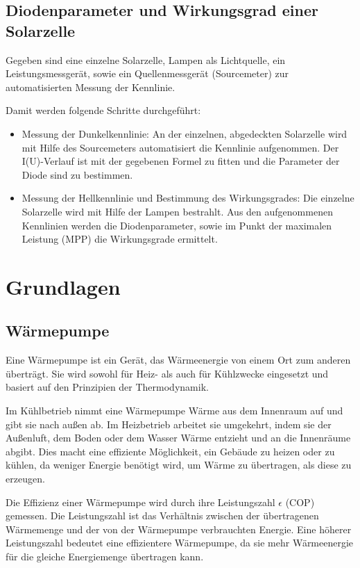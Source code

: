 \documentclass[12pt,english,ngerman]{scrartcl}
\begin{document}
\subsection{Diodenparameter und Wirkungsgrad einer Solarzelle}

Gegeben sind eine einzelne Solarzelle, Lampen als Lichtquelle, ein
Leistungsmessgerät, sowie ein Quellenmessgerät (Sourcemeter) zur
automatisierten Messung der Kennlinie.

Damit werden folgende Schritte durchgeführt:

\begin{itemize}
	\item Messung der Dunkelkennlinie: An der einzelnen, abgedeckten Solarzelle wird mit
	      Hilfe des Sourcemeters automatisiert die Kennlinie aufgenommen. Der
	      I(U)-Verlauf ist mit der gegebenen Formel zu fitten und die Parameter der Diode
	      sind zu bestimmen.
	\item Messung der Hellkennlinie und Bestimmung des Wirkungsgrades: Die einzelne
	      Solarzelle wird mit Hilfe der Lampen bestrahlt. Aus den aufgenommenen
	      Kennlinien werden die Diodenparameter, sowie im Punkt der maximalen Leistung
	      (MPP) die Wirkungsgrade ermittelt.
\end{itemize}

\section{Grundlagen}\label{Grund}

\subsection{Wärmepumpe}
Eine Wärmepumpe ist ein Gerät, das Wärmeenergie von einem Ort zum anderen
überträgt. Sie wird sowohl für Heiz- als auch für Kühlzwecke eingesetzt und
basiert auf den Prinzipien der Thermodynamik.

Im Kühlbetrieb nimmt eine Wärmepumpe Wärme aus dem Innenraum auf und gibt sie
nach außen ab. Im Heizbetrieb arbeitet sie umgekehrt, indem sie der Außenluft,
dem Boden oder dem Wasser Wärme entzieht und an die Innenräume abgibt. Dies
macht eine effiziente Möglichkeit, ein Gebäude zu heizen oder zu kühlen, da
weniger Energie benötigt wird, um Wärme zu übertragen, als diese zu erzeugen.

Die Effizienz einer Wärmepumpe wird durch ihre Leistungszahl $\epsilon$ (COP)
gemessen. Die Leistungszahl ist das Verhältnis zwischen der übertragenen
Wärmemenge und der von der Wärmepumpe verbrauchten Energie. Eine höherer
Leistungszahl bedeutet eine effizientere Wärmepumpe, da sie mehr Wärmeenergie
für die gleiche Energiemenge übertragen kann.
\end{document}
